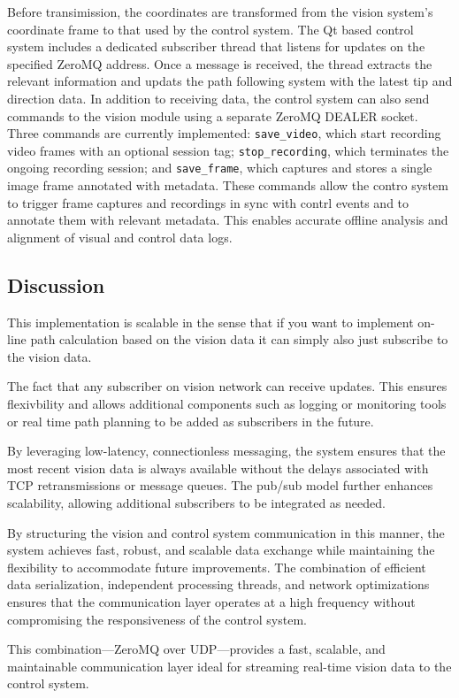\newline \newline 
Before transimission, the coordinates are transformed from the vision system's coordinate frame to that used by the control system. The Qt based control system includes a dedicated subscriber thread that listens for updates on the specified ZeroMQ address. Once a message is received, the thread extracts the relevant information and updats the path following system with the latest tip and direction data. 
\newline \newline
In addition to receiving data, the control system can also send commands to the vision module using a separate ZeroMQ DEALER socket. Three commands are currently implemented: \texttt{save\_video}, which start recording video frames with an optional session tag; \texttt{stop\_recording}, which terminates the ongoing recording session; and \texttt{save\_frame}, which captures and stores a single image frame annotated with metadata. These commands allow the contro system to trigger frame captures and recordings in sync with contrl events and to annotate them with relevant metadata. This enables accurate offline analysis and alignment of visual and control data logs.



\subsection{Discussion}
This implementation is scalable in the sense that if you want to implement on-line path calculation based on the vision data it can simply also just subscribe to the vision data.

The fact that any subscriber on vision network can receive updates. This ensures flexivbility and allows additional components such as logging or monitoring tools or real time path planning to be added as subscribers in the future.

By leveraging low-latency, connectionless messaging, the system ensures that the most recent vision data is always available without the delays associated with TCP retransmissions or message queues. The pub/sub model further enhances scalability, allowing additional subscribers to be integrated as needed.

By structuring the vision and control system communication in this manner, the system achieves fast, robust, and scalable data exchange while maintaining the flexibility to accommodate future improvements. The combination of efficient data serialization, independent processing threads, and network optimizations ensures that the communication layer operates at a high frequency without compromising the responsiveness of the control system. 

 This combination—ZeroMQ over UDP—provides a fast, scalable, and maintainable communication layer ideal for streaming real-time vision data to the control system.

